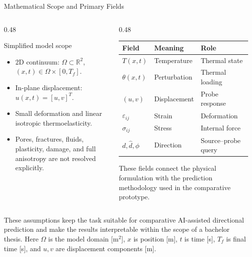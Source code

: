 \documentclass[aspectratio=169,10pt]{beamer}
\begin{document}
\begin{frame}{Mathematical Scope and Primary Fields}
  \begin{columns}[T]
    \begin{column}{0.48\textwidth}
      \begin{block}{Simplified model scope}
        \footnotesize
        \begin{itemize}
          \item 2D continuum: $\Omega\subset\mathbb{R}^{2}$,
                $(x,t)\in\Omega\times[0,T_f]$.
          \item In-plane displacement: $u(x,t)=[u,v]^T$.
          \item Small deformation and linear isotropic thermoelasticity.
          \item Pores, fractures, fluids, plasticity, damage, and full
                anisotropy are not resolved explicitly.
        \end{itemize}
      \end{block}
    \end{column}
    \begin{column}{0.48\textwidth}
      \footnotesize
      \begin{tabular}{@{}lll@{}}
        \toprule
        \textbf{Field} & \textbf{Meaning} & \textbf{Role} \\
        \midrule
        $T(x,t)$ & Temperature & Thermal state \\
        $\theta(x,t)$ & Perturbation & Thermal loading \\
        $(u,v)$ & Displacement & Probe response \\
        $\varepsilon_{ij}$ & Strain & Deformation \\
        $\sigma_{ij}$ & Stress & Internal force \\
        $d,\hat d,\phi$ & Direction & Source--probe query \\
        \bottomrule
      \end{tabular}
      \vskip 6pt
      These fields connect the physical formulation with the prediction
      methodology used in the comparative prototype.
    \end{column}
  \end{columns}
  \vskip 4pt
  \scriptsize
  These assumptions keep the task suitable for comparative AI-assisted
  directional prediction and make the results interpretable within the scope
  of a bachelor thesis. Here $\Omega$ is the model domain [m$^2$], $x$ is
  position [m], $t$ is time [s], $T_f$ is final time [s], and $u,v$ are
  displacement components [m].
\end{frame}
\end{document}

